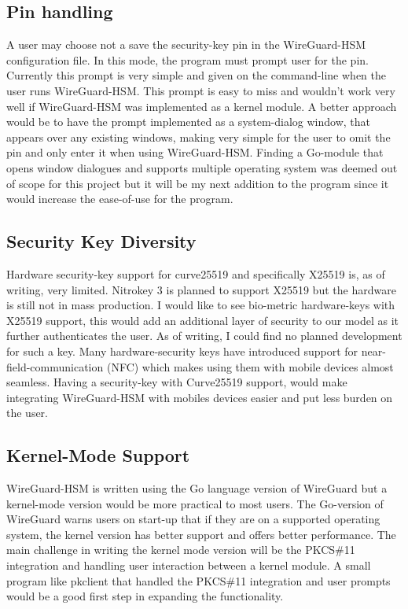 \documentclass [11pt, proquest] {uwthesis}[2020/02/24]
\begin{document}
\subsection{Pin handling}
 A user may choose not a save the security-key pin in the WireGuard-HSM configuration file. In this mode, the program must prompt user for the pin. Currently this prompt is very simple and given on the command-line when the user runs WireGuard-HSM. This prompt is easy to miss and wouldn't work very well if WireGuard-HSM was implemented as a kernel module. A better approach would be to have the prompt implemented as a system-dialog window, that appears over any existing windows, making very simple for the user to omit the pin and only enter it when using WireGuard-HSM. Finding a Go-module that opens window dialogues and supports multiple operating system was deemed out of scope for this project but it will be my next addition to the program since it would increase the ease-of-use for the program. 
 
\subsection{Security Key Diversity}
Hardware security-key support for curve25519 and specifically X25519 is, as of writing, very limited. Nitrokey 3 is planned to support X25519 but the hardware is still not in mass production. I would like to see bio-metric hardware-keys with X25519 support, this would add an additional layer of security to our model as it further authenticates the user. As of writing, I could find no planned development for such a key. Many hardware-security keys have introduced support for near-field-communication (NFC) which makes using them with mobile devices almost seamless. Having a security-key with Curve25519 support, would make integrating WireGuard-HSM with mobiles devices easier and put less burden on the user. 

\subsection{Kernel-Mode Support}
WireGuard-HSM is written using the Go language version of WireGuard but a kernel-mode version would be more practical to most users. The Go-version of WireGuard warns users on start-up that if they are on a supported operating system, the kernel version has better support and offers better performance. The main challenge in writing the kernel mode version will be the PKCS\#11 integration and handling user interaction between a kernel module. A small program like pkclient that handled the PKCS\#11 integration and user prompts would be a good first step in expanding the functionality.
\end{document}
